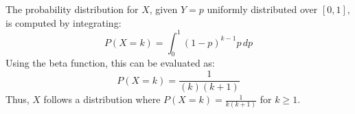 \solution

The probability distribution for \( X \), given \( Y = p \) uniformly distributed over \([0,1]\), is computed by integrating:
\[ P(X = k) = \int_0^1 (1-p)^{k-1} p \, dp \]
Using the beta function, this can be evaluated as:
\[ P(X = k) = \frac{1}{(k)(k+1)} \]
Thus, \( X \) follows a distribution where \( P(X = k) = \frac{1}{k(k+1)} \) for \( k \geq 1 \).

